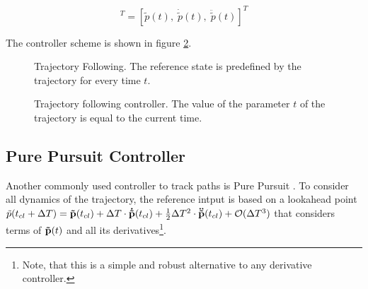 \begin{equation}
  [r_{ref}(t), \; \dot{r}_{ref}(t), \; \ddot{r}_{ref}(t)]^T = [\tilde{p}(t), \; \dot{\tilde{p}}(t), \; \ddot{\tilde{p}}(t)]^T
\end{equation}

The controller scheme is shown in figure \ref{fig:trajectoryfollowing}. 

\begin{figure}[h]
    \centering
    \def\svgwidth{0.4\columnwidth}
    
    \caption{Trajectory Following. The reference state is predefined by the trajectory for every time $t$.}
    \label{fig:scene_trajectoryFollowing}
\end{figure}

\begin{figure}[h]
    \centering
    \def\svgwidth{\columnwidth}
    
    \caption{Trajectory following controller. The value of the parameter $t$ of the trajectory is equal to the current time.}
    \label{fig:trajectoryfollowing}
\end{figure}



\subsection{Pure Pursuit Controller}
Another commonly used controller to track paths is Pure Pursuit \cite{snider}. To consider all dynamics of the trajectory, the reference intput is based on a lookahead point $\tilde{p}(t_{cl}+\Delta T) = {\bf \tilde{p}}(t_{cl}) + \Delta T \cdot {\bf\dot{ \tilde{p}}}(t_{cl}) + \frac{1}{2} \Delta T^2 \cdot {\bf\ddot{ \tilde{p}}}(t_{cl}) + \mathcal{O}(\Delta T^3)$ that considers terms of ${\bf \tilde{p}}(t)$ and all its derivatives\footnote{Note, that this is a simple and robust alternative to any derivative controller.}.

